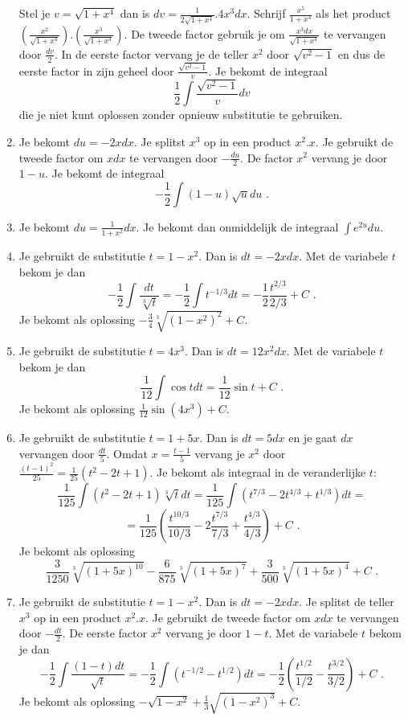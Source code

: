 \documentclass{article}
\begin{document}
\begin{enumerate}
Stel je $v=\sqrt {1+x^4}$ dan is $dv=\frac {1}{2\sqrt{1+x^4}}.4x^3dx$.
Schrijf $\frac{x^5}{1+x^4}$ als het product $\left( \frac{x^2}{\sqrt{1+x^4}}  \right).\left(  \frac{x^3}{\sqrt{1+x^4}} \right)$.
De tweede factor gebruik je om $\frac{x^3dx}{\sqrt{1+x^4}}$ te vervangen door $\frac{dv}{2}$.
In de eerste factor vervang je de teller $x^2$ door $\sqrt{v^2-1}$ en dus de eerste factor in zijn geheel door $\frac{\sqrt{v^2-1}}{v}$.
Je bekomt de integraal
\[
\frac{1}{2} \int \frac{\sqrt{v^2-1}}{v}dv
\]
die je niet kunt oplossen zonder opnieuw substitutie te gebruiken.

\item
Je bekomt $du=-2xdx$.
Je splitst $x^3$ op in een product $x^2.x$.
Je gebruikt de tweede factor om $xdx$ te vervangen door $-\frac{du}{2}$.
De factor $x^2$ vervang je door $1-u$.
Je bekomt de integraal
\[
-\frac{1}{2} \int (1-u) \sqrt {u}du \text { .}
\]

\item
Je bekomt $du=\frac{1}{1+x^2}dx$.
Je bekomt dan onmiddelijk de integraal $\int e^{2u}du$.

\item
Je gebruikt de substitutie $t=1-x^2$.
Dan is $dt=-2xdx$.
Met de variabele $t$ bekom je dan
\[
-\frac{1}{2} \int \frac {dt}{\sqrt[3]{t}}=-\frac{1}{2}\int t^{-1/3}dt=-\frac{1}{2}\frac {t^{2/3}}{2/3}+C \text { .}
\]
Je bekomt als oplossing $-\frac{3}{4}\sqrt[3]{\left( 1-x^2  \right)^2}+C$.

\item
Je gebruikt de substitutie $t=4x^3$.
Dan is $dt=12x^2dx$.
Met de variabele $t$ bekom je dan
\[
\frac{1}{12} \int \cos tdt=\frac{1}{12} \sin t+C \text { .}
\]
Je bekomt als oplossing $\frac{1}{12} \sin \left( 4x^3 \right)+C$.

\item
Je gebruikt de substitutie $t=1+5x$.
Dan is $dt=5dx$ en je gaat $dx$ vervangen door $\frac{dt}{5}$.
Omdat $x=\frac {t-1}{5}$ vervang je $x^2$ door $\frac {(t-1)^2}{25}=\frac{1}{25}\left(  t^2-2t+1 \right)$.
Je bekomt als integraal in de veranderlijke $t$:
\[
\frac{1}{125}\int \left(  t^2-2t+1 \right)\sqrt[3]{t}dt=\frac{1}{125}\int \left(  t^{7/3}-2t^{4/3}+t^{1/3}  \right)dt=
\]
\[
=\frac{1}{125}\left(  \frac{t^{10/3}}{10/3}-2 \frac{t^{7/3}}{7/3}+\frac{t^{4/3}}{4/3}  \right) +C \text { .}
\]
Je bekomt als oplossing
\[
\frac{3}{1250}\sqrt[3]{(1+5x)^{10}}-\frac{6}{875}\sqrt[3]{(1+5x)^7}+\frac{3}{500}\sqrt[3]{(1+5x)^4}+C \text { .}
\]

\item
Je gebruikt de substitutie $t=1-x^2$.
Dan is $dt=-2xdx$.
Je splitst de teller $x^3$ op in een product $x^2.x$.
Je gebruikt de tweede factor om $xdx$ te vervangen door $-\frac{dt}{2}$.
De eerste factor $x^2$ vervang je door $1-t$.
Met de variabele $t$ bekom je dan
\[
-\frac {1}{2} \int \frac {(1-t)dt}{\sqrt {t}}=-\frac{1}{2} \int \left( t^{-1/2}-t^{1/2}  \right)dt=-\frac{1}{2} \left( \frac{t^{1/2}}{1/2}-\frac{t^{3/2}}{3/2}  \right)+C \text { .}
\]
Je bekomt als oplossing $-\sqrt {1-x^2} +\frac{1}{3} \sqrt{\left( 1-x^2  \right)^3}+C$.


\end{enumerate}
\end{document}
